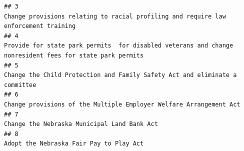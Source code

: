 \documentclass[]{book}
\begin{document}
\begin{verbatim}
## 3                                                                                                                                                                                                                                                                                                                                                                                  Change provisions relating to racial profiling and require law enforcement training
## 4                                                                                                                                                                                                                                                                                                                                                             Provide for state park permits  for disabled veterans and change nonresident fees for state park permits
## 5                                                                                                                                                                                                                                                                                                                                                                                          Change the Child Protection and Family Safety Act and eliminate a committee
## 6                                                                                                                                                                                                                                                                                                                                                                                                   Change provisions of the Multiple Employer Welfare Arrangement Act
## 7                                                                                                                                                                                                                                                                                                                                                                                                                          Change the Nebraska Municipal Land Bank Act
## 8                                                                                                                                                                                                                                                                                                                                                                                                                              Adopt the Nebraska Fair Pay to Play Act

\end{verbatim}
\end{document}
